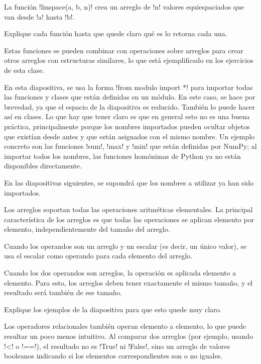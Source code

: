 \documentclass[10pt]{article}
\begin{document}
  La función \li!linspace(a, b, n)!
  crea un arreglo de \li!n! valores equiespaciados
  que van desde \li!a! hasta \li!b!.

  Explique cada función
  hasta que quede claro qué es lo retorna cada una.

  Estas funciones se pueden combinar
  con operaciones sobre arreglos
  para crear otros arreglos
  con estructuras similares,
  lo que está ejemplificado en los ejercicios
  de esta clase.

  En esta diapositiva,
  se usa la forma \li!from modulo import *!
  para importar todas las funciones y clases
  que están definidas en un módulo.
  En este caso, se hace por brevedad,
  ya que el espacio de la diapositiva es reducido.
  También lo puede hacer así en clases.
  Lo que hay que tener claro
  es que en general esto no es una buena práctica,
  principalmente porque los nombres importados
  pueden ocultar objetos que existían desde antes
  y que están asignados con el mismo nombre.
  Un ejemplo concreto son las funciones
  \li!sum!, \li!max! y \li!min!
  que están definidas por NumPy;
  al importar todos los nombres,
  las funciones homónimas de Python
  ya no están disponibles directamente.

  En las diapositivas siguientes,
  se supondrá que los nombres a utilizar
  ya han sido importados.


  Los arreglos soportan
  todas las operaciones aritméticas elementales.
  La principal característica de los arreglos
  es que todas las operaciones se aplican
  elemento por elemento,
  independientemente del tamaño del arreglo.

  Cuando los operandos son
  un arreglo y un escalar
  (es decir, un único valor),
  se usa el escalar como operando
  para cada elemento del arreglo.

  Cuando los dos operandos son arreglos,
  la operación es aplicada
  elemento a elemento.
  Para esto, los arreglos deben tener
  exactamente el mismo tamaño,
  y el resultado será también de ese tamaño.

  Explique los ejemplos de la diapositiva
  para que esto quede muy claro.


  Los operadores relacionales
  también operan elemento a elemento,
  lo que puede resultar un poco menos intuitivo.
  Al comparar dos arreglos
  (por ejemplo, usando \li!<! o \li!==!),
  el resultado no es \li!True! ni \li!False!,
  sino un arreglo de valores booleanos
  indicando si los elementos correspondientes
  son o no iguales.
\end{document}

